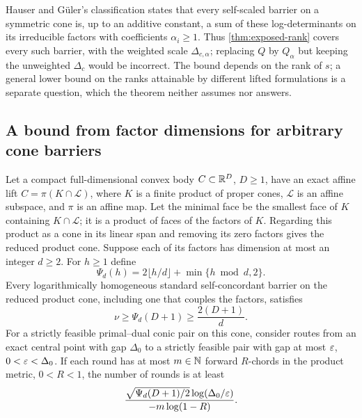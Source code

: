Hauser and G\"uler's classification
\cite[Theorem~5.5]{HauserGuler2002} states that every self-scaled barrier
on a symmetric cone is, up to an additive constant, a sum of these
log-determinants on its irreducible factors with coefficients
$\alpha_i\geq1$. Thus \cref{thm:exposed-rank} covers every such barrier,
with the weighted scale $\Delta_{c,\alpha}$; replacing $Q$ by $Q_\alpha$
but keeping the unweighted $\Delta_c$ would be incorrect.
The bound depends on the rank of $s$; a general lower bound on the
ranks attainable by different lifted formulations is a separate
question, which the theorem neither assumes nor answers.

\subsection{A bound from factor dimensions for arbitrary cone barriers}
\begin{theorem}
\label{thm:dimension-dictionary}
Let a compact full-dimensional convex body $C\subset\mathbb R^D$, $D\geq1$,
have an exact affine lift $C=\pi(K\cap\mathcal L)$, where $K$ is a
finite product of proper cones, $\mathcal L$ is an affine subspace,
and $\pi$ is an affine map. Let the minimal face be the smallest face
of $K$ containing $K\cap\mathcal L$; it is a product of faces of the
factors of $K$. Regarding this product as a cone in its linear span and
removing its zero factors gives the reduced product cone. Suppose
each of its factors has dimension at most an integer $d\geq2$.
For $h\geq1$ define
\[
 \Psi_d(h)=2\lfloor h/d\rfloor+\min\{h\bmod d,2\}.
\]
Every logarithmically homogeneous standard self-concordant barrier on
the reduced product cone, including one that couples the factors,
satisfies
\begin{equation}
 \nu\geq\Psi_d(D+1)\geq\frac{2(D+1)}d.
 \label{eq:dimension-parameter}
\end{equation}
For a strictly feasible primal--dual conic pair on this cone, consider
routes from an exact central point with gap $\Delta_0$ to a strictly
feasible pair with gap at most $\varepsilon$, $0<\varepsilon<\Delta_0$. If each
round has at most $m\in\mathbb N$ forward $R$-chords in the product metric,
$0<R<1$, the number of rounds is at least
\begin{equation}
 \frac{\sqrt{\Psi_d(D+1)/2}\log(\Delta_0/\varepsilon)}{-m\log(1-R)}.
 \label{eq:dimension-movement}
\end{equation}
\end{theorem}

